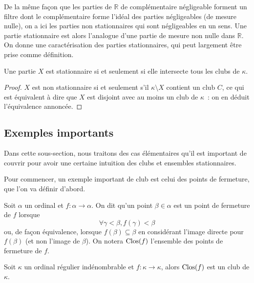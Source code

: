 De la même façon que les parties de $\mathbb R$ de complémentaire négligeable
forment un filtre dont le complémentaire forme l'idéal des parties négligeables
(de mesure nulle), on a ici les parties non stationnaires qui sont négligeables
en un sens. Une partie stationnaire est alors l'analogue d'une partie de mesure
non nulle dans $\mathbb R$. On donne une caractérisation des parties
stationnaires, qui peut largement être prise comme définition.

\begin{proposition}
  Une partie $X$ est stationnaire si et seulement si elle intersecte tous les
  clubs de $\kappa$.
\end{proposition}

\begin{proof}
  $X$ est non stationnaire si et seulement s'il $\kappa\setminus X$ contient
  un club $C$, ce qui est équivalent à dire que $X$ est disjoint avec au moins
  un club de $\kappa$~: on en déduit l'équivalence annoncée.
\end{proof}

\subsection{Exemples importants}

Dans cette sous-section, nous traitons des cas élémentaires qu'il est important
de couvrir pour avoir une certaine intuition des clubs et ensembles
stationnaires.

Pour commencer, un exemple important de club est celui des points de fermeture,
que l'on va définir d'abord.

\begin{definition}
  Soit $\alpha$ un ordinal et $f : \alpha \to \alpha$. On dit qu'un point
  $\beta \in \alpha$ est un point de fermeture de $f$ lorsque
  \[\forall \gamma < \beta, f(\gamma) < \beta\]
  ou, de façon équivalence, lorsque $f(\beta) \subseteq \beta$ en considérant
  l'image directe pour $f(\beta)$ (et non l'image de $\beta$). On notera
  $\operatorname{Clos}(f)$ l'ensemble des points de fermeture de $f$.
\end{definition}

\begin{proposition}
  Soit $\kappa$ un ordinal régulier indénombrable et $f : \kappa \to \kappa$,
  alors $\operatorname{Clos}(f)$ est un club de $\kappa$.
\end{proposition}

